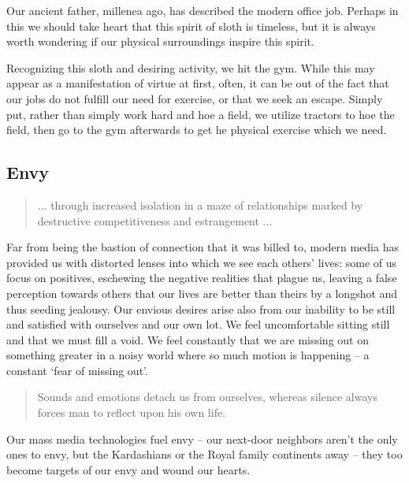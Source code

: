 \documentclass[letterpaper]{article}
\begin{document}
    Our ancient father, millenea ago, has described the modern office job. Perhaps in this we should take heart that this spirit of sloth is timeless, but it is always worth wondering if our physical surroundings inspire this spirit.

    Recognizing this sloth and desiring activity, we hit the gym. While this may appear as a manifestation of virtue at first, often, it can be out of the fact that our jobs do not fulfill our need for exercise, or that we seek an escape. Simply put, rather than simply work hard and hoe a field, we utilize tractors to hoe the field, then go to the gym afterwards to get he physical exercise which we need.

  \subsection{Envy}

    \begin{quote}
      ... through increased isolation in a maze of relationships marked by destructive competitiveness and estrangement ...
    \end{quote}

    Far from being the bastion of connection that it was billed to, modern media has provided us with distorted lenses into which we see each others' lives: some of us focus on positives, eschewing the negative realities that plague us, leaving a false perception towards others that our lives are better than theirs by a longshot and thus seeding jealousy. Our envious desires arise also from our inability to be still and satisfied with ourselves and our own lot. We feel uncomfortable sitting still and that we must fill a void. We feel constantly that we are missing out on something greater in a noisy world where so much motion is happening -- a constant `fear of missing out'.

    \begin{quote}
      Sounds and emotions detach us from ourselves, whereas silence always forces man to reflect upon his own life.
    \end{quote}

    Our mass media technologies fuel envy -- our next-door neighbors aren't the only ones to envy, but the Kardashians or the Royal family continents away -- they too become targets of our envy and wound our hearts.
\end{document}
